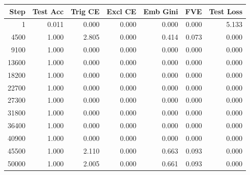 \begin{longtable}{rrrrrrr}
\toprule
Step & Test Acc & Trig CE & Excl CE & Emb Gini & FVE & Test Loss \\
\midrule
\endhead
1 & 0.011 & 0.000 & 0.000 & 0.000 & 0.000 & 5.133 \\
4500 & 1.000 & 2.805 & 0.000 & 0.414 & 0.073 & 0.000 \\
9100 & 1.000 & 0.000 & 0.000 & 0.000 & 0.000 & 0.000 \\
13600 & 1.000 & 0.000 & 0.000 & 0.000 & 0.000 & 0.000 \\
18200 & 1.000 & 0.000 & 0.000 & 0.000 & 0.000 & 0.000 \\
22700 & 1.000 & 0.000 & 0.000 & 0.000 & 0.000 & 0.000 \\
27300 & 1.000 & 0.000 & 0.000 & 0.000 & 0.000 & 0.000 \\
31800 & 1.000 & 0.000 & 0.000 & 0.000 & 0.000 & 0.000 \\
36400 & 1.000 & 0.000 & 0.000 & 0.000 & 0.000 & 0.000 \\
40900 & 1.000 & 0.000 & 0.000 & 0.000 & 0.000 & 0.000 \\
45500 & 1.000 & 2.110 & 0.000 & 0.663 & 0.093 & 0.000 \\
50000 & 1.000 & 2.005 & 0.000 & 0.661 & 0.093 & 0.000 \\
\bottomrule
\end{longtable}
